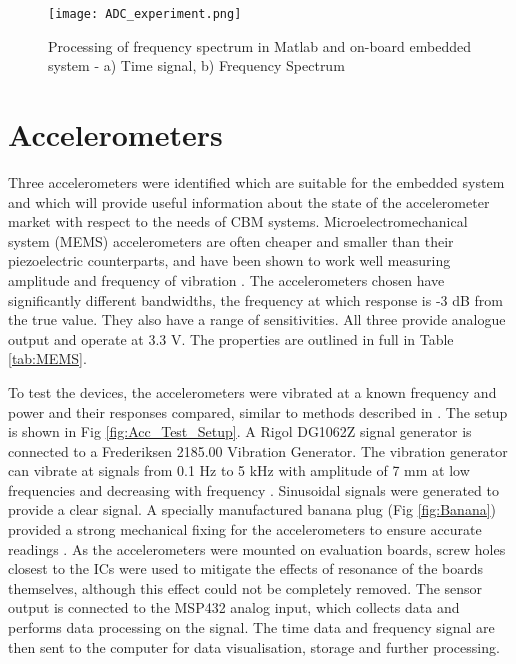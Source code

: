 \begin{figure}
    \centering
    \texttt{[image: ADC\_experiment.png]}
    \caption{Processing of frequency spectrum in Matlab and on-board embedded system - a) Time signal, b) Frequency Spectrum}
    \label{fig:ADC_experiment}
\end{figure}


\section{Accelerometers}

Three accelerometers were identified which are suitable for the embedded system and which will provide useful information about the state of the accelerometer market with respect to the needs of CBM systems.
Microelectromechanical system (MEMS) accelerometers are often cheaper and smaller than their piezoelectric counterparts, and have been shown to work well measuring amplitude and frequency of vibration \cite{MEMS_testing}.
The accelerometers chosen have significantly different bandwidths, the frequency at which response is -3 dB from the true value.
They also have a range of sensitivities.
All three provide analogue output and operate at 3.3 V.
The properties are outlined in full in Table \ref{tab:MEMS}.
\par

To test the devices, the accelerometers were vibrated at a known frequency and power and their responses compared, similar to methods described in \cite{MEMS_testing}\cite{MEMS_testing2}.
The setup is shown in Fig \ref{fig:Acc_Test_Setup}.
A Rigol DG1062Z signal generator is connected to a Frederiksen 2185.00 Vibration Generator.
The vibration generator can vibrate at signals from 0.1 Hz to 5 kHz with amplitude of 7 mm at low frequencies and decreasing with frequency \cite{Frederiksen}.
Sinusoidal signals were generated to provide a clear signal.
A specially manufactured banana plug (Fig \ref{fig:Banana}) provided a strong mechanical fixing for the accelerometers to ensure accurate readings \cite{Smart_Bearings_1}.
As the accelerometers were mounted on evaluation boards, screw holes closest to the ICs were used to mitigate the effects of resonance of the boards themselves, although this effect could not be completely removed.
The sensor output is connected to the MSP432 analog input, which collects data and performs data processing on the signal.
The time data and frequency signal are then sent to the computer for data visualisation, storage and further processing.
\par

